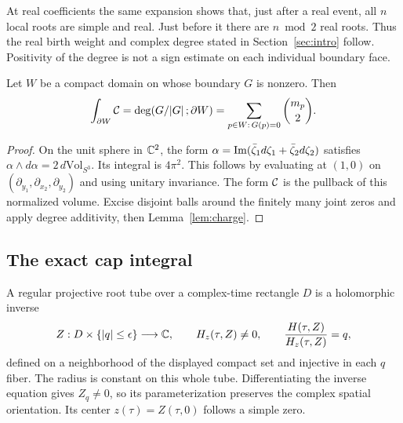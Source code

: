 At real coefficients the same expansion shows that, just after a real
event, all $n$ local roots are simple and real. Just before it there
are $n\bmod2$ real roots. Thus the real birth weight and complex
degree stated in Section~\ref{sec:intro} follow. Positivity of the
degree is not a sign estimate on each individual boundary face.

\begin{lemma}
\label{lem:degree}
Let $W$ be a compact domain on whose boundary $G$ is nonzero.
Then
\begin{equation}
 \int_{\partial W}\mathcal C
 =\deg(G/|G|\,;\partial W)
 =\sum_{p\in W:\,G(p)=0}\binom{m_p}{2}.
 \label{eq:degree}
\end{equation}
\end{lemma}
\begin{proof}
On the unit sphere in $\mathbb C^2$, the form
$\alpha=\operatorname{Im}(\bar\zeta_1d\zeta_1+\bar\zeta_2d\zeta_2)$ satisfies
$\alpha\wedge d\alpha=2\,d\mathrm{Vol}_{S^3}$.
Its integral is $4\pi^2$. This follows by evaluating at $(1,0)$
on $(\partial_{y_1},\partial_{x_2},\partial_{y_2})$ and using
unitary invariance. The form $\mathcal C$ is the pullback of this normalized
volume. Excise disjoint balls around the finitely many joint zeros
and apply degree additivity, then Lemma~\ref{lem:charge}.
\end{proof}

\subsection{The exact cap integral}

A regular projective root tube over a complex-time rectangle $D$
is a holomorphic inverse
\begin{equation}
 Z:D\times\{|q|\le\epsilon\}\longrightarrow\mathbb C,
 \qquad H_z(\tau,Z)\ne0,\qquad
 \frac{H(\tau,Z)}{H_z(\tau,Z)}=q,
 \label{eq:inverse}
\end{equation}
defined on a neighborhood of the displayed compact set and injective
in each $q$ fiber. The radius is constant on this whole tube.
Differentiating the inverse equation gives $Z_q\ne0$, so its
parameterization preserves the complex spatial orientation. Its
center $z(\tau)=Z(\tau,0)$ follows a simple zero.

